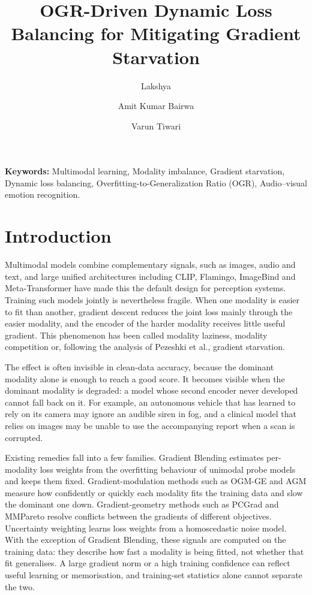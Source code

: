 \documentclass[fleqn,10pt]{wlscirep}
\title{OGR-Driven Dynamic Loss Balancing for Mitigating Gradient Starvation}
\author[1]{Lakshya}
\author[1,*]{Amit Kumar Bairwa}
\author[1,*]{Varun Tiwari}
\affil[1]{Department of Artificial Intelligence and Machine Learning, School of Computer Science and Engineering, Manipal University Jaipur, Jaipur--Ajmer Express Highway, Jaipur, India.}
\affil[*]{amitkumar.bairwa@jaipur.manipal.edu}
\affil[*]{varun.tiwari@jaipur.manipal.edu}
\affil[*]{Corresponding Authors}
\begin{document}
\flushbottom
\maketitle
\thispagestyle{empty}

\noindent\textbf{Keywords:} Multimodal learning, Modality imbalance, Gradient starvation, Dynamic loss balancing, Overfitting-to-Generalization Ratio (OGR), Audio--visual emotion recognition.

\section*{Introduction}
Multimodal models combine complementary signals, such as images, audio and text, and large unified architectures including CLIP\cite{radford2021learning}, Flamingo\cite{alayrac2022flamingo}, ImageBind\cite{girdhar2023imagebind} and Meta-Transformer\cite{zhang2023meta} have made this the default design for perception systems. Training such models jointly is nevertheless fragile. When one modality is easier to fit than another, gradient descent reduces the joint loss mainly through the easier modality, and the encoder of the harder modality receives little useful gradient. This phenomenon has been called modality laziness, modality competition\cite{huang2022modality} or, following the analysis of Pezeshki et al.\cite{pezeshki2021gradient}, gradient starvation.

The effect is often invisible in clean-data accuracy, because the dominant modality alone is enough to reach a good score. It becomes visible when the dominant modality is degraded: a model whose second encoder never developed cannot fall back on it. For example, an autonomous vehicle that has learned to rely on its camera may ignore an audible siren in fog, and a clinical model that relies on images may be unable to use the accompanying report when a scan is corrupted.

Existing remedies fall into a few families\cite{xu2025balancebenchmark}. Gradient Blending\cite{wang2020makes} estimates per-modality loss weights from the overfitting behaviour of unimodal probe models and keeps them fixed. Gradient-modulation methods such as OGM-GE\cite{peng2022balanced} and AGM\cite{li2023boosting} measure how confidently or quickly each modality fits the training data and slow the dominant one down. Gradient-geometry methods such as PCGrad\cite{yu2020gradient} and MMPareto\cite{wei2024mmpareto} resolve conflicts between the gradients of different objectives. Uncertainty weighting\cite{kendall2018multi} learns loss weights from a homoscedastic noise model. With the exception of Gradient Blending, these signals are computed on the training data: they describe how fast a modality is being fitted, not whether that fit generalises. A large gradient norm or a high training confidence can reflect useful learning or memorisation, and training-set statistics alone cannot separate the two.
\end{document}
